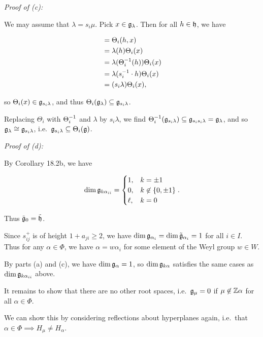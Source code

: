 \emph{Proof of (c):}

We may assume that \(\lambda = s_i \mu\). Pick \(x\in {\mathfrak{g}}_\lambda\).
Then for all \(h\in {\mathfrak{h}}\), we have

\begin{align*}
[\Theta_i(h), \Theta_i(x)] &= \Theta_i(h, x) \\
&= \lambda(h)\Theta_i(x) \\
&= \lambda(\Theta_i\inv (h)) \Theta_i(x) \\
&= \lambda(s_i\inv \cdot h) \Theta_i(x) \\
&= (s_i\lambda) \Theta_i(x)
,\end{align*}

so \(\Theta_i(x) \in {\mathfrak{g}}_{s_i\lambda}\), and thus
\(\Theta_i({\mathfrak{g}}_\lambda) \subseteq {\mathfrak{g}}_{s_i\lambda}\).

Replacing \(\Theta_i\) with \(\Theta_i^{-1}\) and \(\lambda\) by
\(s_i \lambda\), we find
\(\Theta_i^{-1} ({\mathfrak{g}}_{s_i \lambda}) \subseteq {\mathfrak{g}}_{s_i s_i \lambda} = {\mathfrak{g}}_\lambda\),
and so \({\mathfrak{g}}_\lambda \cong {\mathfrak{g}}_{s_i \lambda}\),
i.e.~\({\mathfrak{g}}_{s_i \lambda} \subseteq \Theta_i({\mathfrak{g}})\).

\emph{Proof of (d):}

By Corollary 18.2b, we have

\begin{align*}
\dim {\mathfrak{g}}_{k \alpha_{ii}} =
\begin{cases}
1, & k= \pm 1 \\
0, & k\not \in \left\{{0, \pm 1}\right\} \\
\ell, & k = 0
\end{cases}
.\end{align*}

Thus \(\tilde {{\mathfrak{g}}}_0 = \tilde {{\mathfrak{h}}}\).

Since \(s_{ij}^+\) is of height \(1+a_{ji} \geq 2\), we have
\(\dim {\mathfrak{g}}_{\alpha_i} = \dim \tilde {{\mathfrak{g}}}_{\alpha_i} = 1\) for all
\(i\in I\). Thus for any \(\alpha \in \Phi\), we have
\(\alpha = w \alpha_i\) for some element of the Weyl group \(w\in W\).

By parts (a) and (c), we have \(\dim {\mathfrak{g}}_{\alpha} = 1\), so
\(\dim {\mathfrak{g}}_{k\alpha}\) satisfies the same cases as
\(\dim {\mathfrak{g}}_{k\alpha_{ii}}\) above.

It remains to show that there are no other root spaces,
i.e.~\({\mathfrak{g}}_\mu = 0\) if \(\mu \not\in {\mathbb{Z}}\alpha\) for all
\(\alpha \in \Phi\).

We can show this by considering reflections about hyperplanes again,
i.e.~that \(\alpha \in \Phi \implies H_\mu \neq H_\alpha\).

